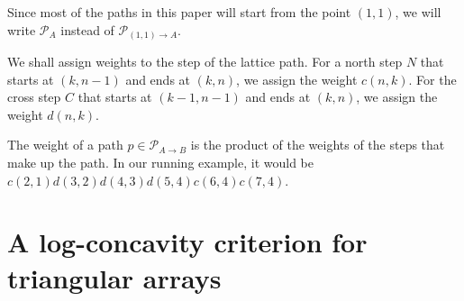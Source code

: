 \documentclass{article}
\newcommand{\lp}{\mathcal{P}}
\theoremstyle{definition}
\numberwithin{equation}{section}
\begin{document}
Since most of the paths in this paper will start from the point $(1,1)$, we will write $\lp_{A}$ instead of $\lp_{(1,1)\rightarrow A}$.

We shall assign weights to the step of the lattice path. For a north step $N$ that starts at $(k,n-1)$ and ends at $(k,n)$, we assign the weight $c(n,k)$. For the cross step $C$ that starts at $(k-1,n-1)$ and ends at $(k,n)$, we assign the weight $d(n,k)$. 

\begin{center}
\end{center}

The weight of a path $p \in \lp_{A \rightarrow B}$ is the product of the weights of the steps that make up the path. In our running example, it would be $c(2,1)d(3,2)d(4,3)d(5,4)c(6,4)c(7,4)$.

\section{A log-concavity criterion for triangular arrays}
\end{document}
